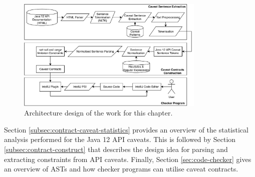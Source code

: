 \begin{figure}[h]
	\label{fig:contracct-architecture}
	\centering
	\includegraphics[width=0.8\textwidth]{figs/contract-architecture.pdf}
	\caption{Architecture design of the work for this chapter.}
\end{figure}

Section \ref{subsec:contract-caveat-statistics} provides an overview of the statistical analysis performed for the Java 12 API caveats. This is followed by Section \ref{subsec:contract-construct} that describes the design idea for parsing and extracting constraints from API caveats. Finally, Section \ref{sec:code-checker} gives an overview of ASTs and how checker programs can utilise caveat contracts.

